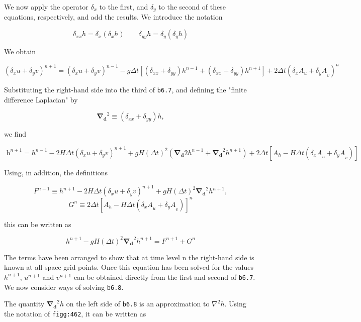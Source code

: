 We now apply the operator \(\delta_{x}\) to the first, and
\(\delta_{y}\) to the second of these equations, respectively, and add
the results. We introduce the notation

\[\delta_{xx}h = \delta_x(\delta_x h ) \qquad  \delta_{yy}h = \delta_y(\delta_y h )\]

We obtain

\[\left( \delta_{x}u + \delta_{y}v \right)^{n + 1} =
\left( \delta_{x}u + \delta_{y}v \right)^{n - 1} 
- g\Delta t \left[ ( \delta_{xx} + \delta_{yy} )h^{n - 1} 
+ ( \delta_{xx} + \delta_{yy} )h^{n + 1}\right] +
2\Delta t( \delta_{x}A_{u} + {\delta_{y}A}_{v})^{n}\]

Substituting the right-hand side into the third of \texttt{b6.7}, and
defining the "finite difference Laplacian" by

\[\mathbf{\nabla_d}^2 \equiv ( \delta_{xx} + \delta_{yy} )h,\]

we find

\[\text{  h}^{n + 1} = h^{n - 1} - 2H\Delta t\left( \delta_{x}u + \delta_{y}v \right)^{n + 1}
 + gH\left( \Delta t \right)^{2}\left( \mathbf{\nabla_d}{2}h^{n - 1} + \mathbf{\nabla_d}^{2}h^{n + 1} \right) 
 + 2\Delta t\left\lbrack A_{h} - H\Delta t\left( {\delta_{x}A}_{u} + {\delta_{y}A}_{v} \right) \right\rbrack\]

Using, in addition, the definitions

\[F^{n + 1} \equiv h^{n + 1} - 2H\Delta t \left( \delta_{x}u + \delta_{y}v \right)^{n + 1} + gH(\Delta t)^{2}\mathbf{\nabla_d}^2 h^{n + 1},\]\[G^{n} \equiv 2\Delta t \left\lbrack A_{h} - H\Delta t\left( {\delta_{x}A}_{u} + {\delta_{y}A}_{v} \right) \right\rbrack^{n}\]

this can be written as

\[h^{n + 1} - gH(\Delta t )^{2}\mathbf{\nabla_d}^{2}h^{n + 1} = F^{n + 1} + G^{n}\]

The terms have been arranged to show that at time level n the right-hand
side is known at all space grid points. Once this equation has been
solved for the values \(h^{n + 1}\), \(u^{n + 1}\) and \(v^{n + 1}\) can
be obtained directly from the first and second of \texttt{b6.7}. We now
consider ways of solving \texttt{b6.8}.

The quantity \(\mathbf{\nabla_d}^{2}h\) on the left side of
\texttt{b6.8} is an approximation to \(\nabla^{2}h\). Using the
notation of \texttt{figg:462}, it can be written as


